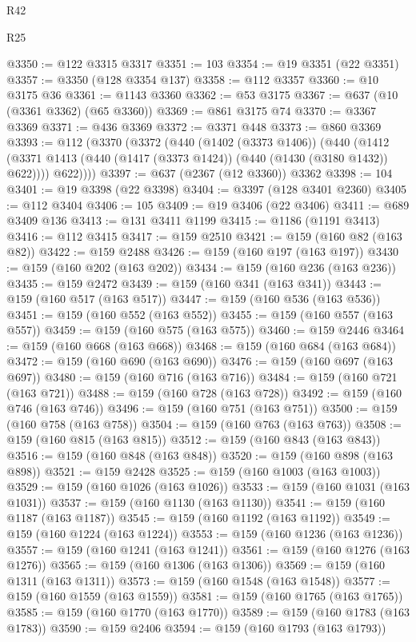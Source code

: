 \begin{lexlean}{R42}
\begin{lexlean}{R25}
\begin{coremodule}
{{{{{{{{{{{{{{{{{{{{{{{{{{{{{{{{{{{{{{{{{{{{{{{{{{{{{{{{{{{{{{{{{{{{{{{{{{{{{{{{{{{{{{{{{{{{{{{{{{{{{{{{{{{{{{{{{{{{{{{{{{{{{{{{{{{{{{{{{{{{{{{{{{{{{{{{{{{{{{{{{{{{{{{{{{{{{{{{{{{{{{{{{{{{{{{{{{{{{{{@3350 := @122 @3315 @3317
@3351 := 103
@3354 := @19 @3351 (@22 @3351)
@3357 := @3350 (@128 @3354 @137)
@3358 := @112 @3357
@3360 := @10 @3175 @36
@3361 := @1143 @3360
@3362 := @53 @3175
@3367 := @637 (@10 (@3361 @3362) (@65 @3360))
@3369 := @861 @3175 @74
@3370 := @3367 @3369
@3371 := @436 @3369
@3372 := @3371 @448
@3373 := @860 @3369
@3393 := @112
    (@3370
      (@3372
        (@440
          (@1402 (@3373 @1406))
          (@440
            (@1412 (@3371 @1413 (@440 (@1417 (@3373 @1424)) (@440 (@1430 (@3180 @1432)) @622))))
            @622))))
@3397 := @637 (@2367 (@12 @3360)) @3362
@3398 := 104
@3401 := @19 @3398 (@22 @3398)
@3404 := @3397 (@128 @3401 @2360)
@3405 := @112 @3404
@3406 := 105
@3409 := @19 @3406 (@22 @3406)
@3411 := @689 @3409 @136
@3413 := @131 @3411 @1199
@3415 := @1186 (@1191 @3413)
@3416 := @112 @3415
@3417 := @159 @2510
@3421 := @159 (@160 @82 (@163 @82))
@3422 := @159 @2488
@3426 := @159 (@160 @197 (@163 @197))
@3430 := @159 (@160 @202 (@163 @202))
@3434 := @159 (@160 @236 (@163 @236))
@3435 := @159 @2472
@3439 := @159 (@160 @341 (@163 @341))
@3443 := @159 (@160 @517 (@163 @517))
@3447 := @159 (@160 @536 (@163 @536))
@3451 := @159 (@160 @552 (@163 @552))
@3455 := @159 (@160 @557 (@163 @557))
@3459 := @159 (@160 @575 (@163 @575))
@3460 := @159 @2446
@3464 := @159 (@160 @668 (@163 @668))
@3468 := @159 (@160 @684 (@163 @684))
@3472 := @159 (@160 @690 (@163 @690))
@3476 := @159 (@160 @697 (@163 @697))
@3480 := @159 (@160 @716 (@163 @716))
@3484 := @159 (@160 @721 (@163 @721))
@3488 := @159 (@160 @728 (@163 @728))
@3492 := @159 (@160 @746 (@163 @746))
@3496 := @159 (@160 @751 (@163 @751))
@3500 := @159 (@160 @758 (@163 @758))
@3504 := @159 (@160 @763 (@163 @763))
@3508 := @159 (@160 @815 (@163 @815))
@3512 := @159 (@160 @843 (@163 @843))
@3516 := @159 (@160 @848 (@163 @848))
@3520 := @159 (@160 @898 (@163 @898))
@3521 := @159 @2428
@3525 := @159 (@160 @1003 (@163 @1003))
@3529 := @159 (@160 @1026 (@163 @1026))
@3533 := @159 (@160 @1031 (@163 @1031))
@3537 := @159 (@160 @1130 (@163 @1130))
@3541 := @159 (@160 @1187 (@163 @1187))
@3545 := @159 (@160 @1192 (@163 @1192))
@3549 := @159 (@160 @1224 (@163 @1224))
@3553 := @159 (@160 @1236 (@163 @1236))
@3557 := @159 (@160 @1241 (@163 @1241))
@3561 := @159 (@160 @1276 (@163 @1276))
@3565 := @159 (@160 @1306 (@163 @1306))
@3569 := @159 (@160 @1311 (@163 @1311))
@3573 := @159 (@160 @1548 (@163 @1548))
@3577 := @159 (@160 @1559 (@163 @1559))
@3581 := @159 (@160 @1765 (@163 @1765))
@3585 := @159 (@160 @1770 (@163 @1770))
@3589 := @159 (@160 @1783 (@163 @1783))
@3590 := @159 @2406
@3594 := @159 (@160 @1793 (@163 @1793))
}}}}}}}}}}}}}}}}}}}}}}}}}}}}}}}}}}}}}}}}}}}}}}}}}}}}}}}}}}}}}}}}}}}}}}}}}}}}}}}}}}}}}}}}}}}}}}}}}}}}}}}}}}}}}}}}}}}}}}}}}}}}}}}}}}}}}}}}}}}}}}}}}}}}}}}}}}}}}}}}}}}}}}}}}}}}}}}}}}}}}}}}}}}}}}}}}}}}}}}
\end{coremodule}
\end{lexlean}
\end{lexlean}
